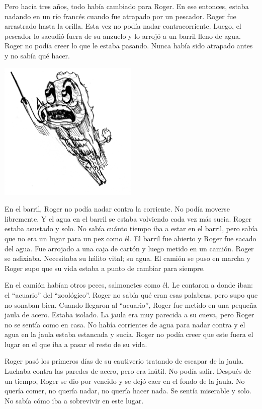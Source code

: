 \documentclass[letterpaper,11pt]{report}
\begin{document}
Pero hacía tres años, todo había cambiado para Roger. En ese entonces, estaba nadando en un río francés cuando fue atrapado por un pescador. Roger fue arrastrado hasta la orilla. Esta vez no podía nadar contracorriente. Luego, el pescador lo sacudió fuera de su anzuelo y lo arrojó a un barril lleno de agua. Roger no podía creer lo que le estaba pasando. Nunca había sido atrapado antes y no sabía qué hacer.

\begin{center}
    \includegraphics[width=0.5\textwidth]{2}
\end{center}

En el barril, Roger no podía nadar contra la corriente. No podía moverse libremente. Y el agua en el barril se estaba volviendo cada vez más sucia. Roger estaba asustado y solo. No sabía cuánto tiempo iba a estar en el barril, pero sabía que no era un lugar para un pez como él. El barril fue abierto y Roger fue sacado del agua. Fue arrojado a una caja de cartón y luego metido en un camión. Roger se asfixiaba. Necesitaba su hálito vital; su agua. El camión se puso en marcha y Roger supo que su vida estaba a punto de cambiar para siempre.

En el camión habían otros peces, salmonetes como él. Le contaron a donde iban: el “acuario” del “zoológico”. Roger no sabía qué eran esas palabras, pero supo que no sonaban bien. Cuando llegaron al “acuario”, Roger fue metido en una pequeña jaula de acero. Estaba isolado. La jaula era muy parecida a su cueva, pero Roger no se sentía como en casa. No había corrientes de agua para nadar contra y el agua en la jaula estaba estancada y sucia. Roger no podía creer que este fuera el lugar en el que iba a pasar el resto de su vida.

Roger pasó los primeros días de su cautiverio tratando de escapar de la jaula. Luchaba contra las paredes de acero, pero era inútil. No podía salir. Después de un tiempo, Roger se dio por vencido y se dejó caer en el fondo de la jaula. No quería comer, no quería nadar, no quería hacer nada. Se sentía miserable y solo. No sabía cómo iba a sobrevivir en este lugar.
\end{document}

